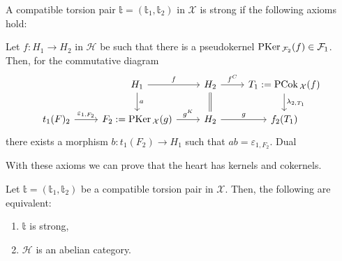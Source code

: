 \begin{definition}
  A compatible torsion pair $\mathbb{t}=(\mathbb{t}_1,\mathbb{t}_2)$ in $\mathcal{X}$
  is strong if the following axioms hold:
  \begin{torsionaxioms}
    \setcounter{enumi}{3}
    \item Let $f:H_1\to H_2$ in $\mathcal{H}$ be such that there is a pseudokernel
    $\mathrm{\textup{PKer\,}}_{\mathcal{F}_2}(f)\in\mathcal{F}_1$. Then, for the commutative diagram
    \begin{equation*}
      \begin{tikzcd}
        & H_1\arrow{d}{a}\arrow{r}{f}
          & H_2\arrow[equal]{d}\arrow{r}{f^C}
            & T_1:=\PCok_\mathcal{X}(f)\arrow{d}{\lambda_{2,T_1}}\\
        t_1(F)_2\arrow{r}{\varepsilon_{1,F_2}}
        & F_2:=\PKer_\mathcal{X}(g)\arrow{r}{g^K}
          & H_2\arrow{r}{g}
            & f_2(T_1)
      \end{tikzcd}
    \end{equation*}
    there exists a morphism $b:t_1(F_2)\to H_1$ such that $ab=\varepsilon_{1,F_2}$.
    \varitem{^\ast} Dual
  \end{torsionaxioms}
\end{definition}

With these axioms we can prove that the heart has kernels and cokernels.

\begin{thm}
  Let $\mathbb{t}=(\mathbb{t}_1,\mathbb{t}_2)$ be a compatible torsion pair in $\mathcal{X}$. Then, the following are
  equivalent:
  \begin{enumerate}[ref=(a)]
    \item $\mathbb{t}$ is strong,
    \item $\mathcal{H}$ is an abelian category.
  \end{enumerate}
\end{thm}

